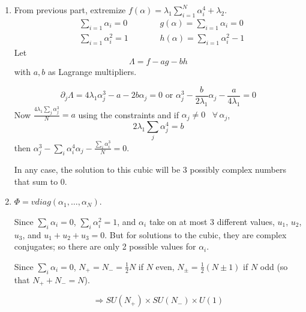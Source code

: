 \documentclass[twoside]{amsart}
\begin{document}
\begin{enumerate}
\[
\begin{aligned}
  \min{ (\lambda_1 C + \lambda) } & \leq (\lambda_1 C + \lambda_2) \\ 
  \frac{1}{ \lambda_1 C + \lambda_2 } & \leq \frac{1}{ \min{ ( \lambda_1 C + \lambda_2) } }
\end{aligned}  \quad \quad \Longrightarrow \frac{-1}{ \lambda_1 C + \lambda_2 } \geq \frac{-1}{ \min{ ( \lambda_1 C + \lambda_2 ) } }
\]
\[
\Longrightarrow V \geq \frac{-m^4}{ 4 \min{ (\lambda_1 C + \lambda_2) } }
\]
\item[(d)] From previous part, extremize $f(\alpha) = \lambda_1 \sum_{i=1}^N \alpha_i^4 + \lambda_2$.  
\[
\begin{aligned}
  & \sum_{i=1} \alpha_i = 0 \\ 
  & \sum_{i=1} \alpha_i^2 = 1 
\end{aligned} \quad \quad  \, \begin{aligned}
  & g(\alpha) = \sum_{i=1} \alpha_i = 0 \\ 
  & h(\alpha) = \sum_{i=1} \alpha_i^2 - 1 
\end{aligned}
\]
Let 
\[
\Lambda = f - ag -bh
\]
with $a,b$ as Lagrange multipliers.  

\[
\partial_j \Lambda = 4 \lambda_1 \alpha_j^3 - a - 2b \alpha_j = 0 \text{ or } \alpha_j^3 - \frac{b}{2\lambda_1} \alpha_j - \frac{a}{4 \lambda_1 } = 0 
\]
Now $ \frac{4\lambda_1 \sum_j \alpha_j^3 }{ N} = a$ using the constraints and if $\alpha_j \neq 0$ \, $\forall \, \alpha_j$, 
\[
2\lambda_1 \sum_j \alpha_j^4 = b
\]
then $\alpha_j^3 - \sum_{i} \alpha_i^4 \alpha_j - \frac{ \sum_i \alpha_i^3 }{ N } = 0$.

In any case, the solution to this cubic will be 3 possibly complex numbers that sum to 0.  

\item[(e)] $\Phi = v diag{(\alpha_1, \dots, \alpha_N)}$.  

Since $\sum_i \alpha_i =0$, $\sum_i \alpha_i^2 =1$, and $\alpha_i$ take on at most 3 different values, $u_1$, $u_2$, $u_3$, and $u_1 + u_2 + u_3 =0$.  But for solutions to the cubic, they are complex conjugates; so there are only 2 possible values for $\alpha_i$.  

Since $\sum_i \alpha_i = 0$, $N_+ = N_- = \frac{1}{2} N$ if $N$ even, $N_{\pm} = \frac{1}{2} (N \pm 1)$ if $N$ odd (so that $N_+ + N_- = N$).  

\[
\Longrightarrow SU(N_+) \times SU(N_-) \times U(1) 
\]
\end{enumerate}
\end{document}
